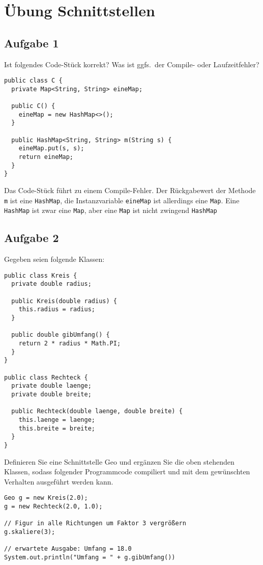 \chapter{Übung Schnittstellen}

\section{Aufgabe 1}
Ist folgendes Code-Stück korrekt? Was ist ggfs.\ der Compile- oder
Laufzeitfehler?

\begin{lstlisting}
public class C {
  private Map<String, String> eineMap;

  public C() {
    eineMap = new HashMap<>();
  }

  public HashMap<String, String> m(String s) {
    eineMap.put(s, s);
    return eineMap;
  }
}
\end{lstlisting}

Das Code-Stück führt zu einem Compile-Fehler. Der Rückgabewert der Methode
\lstinline{m} ist eine \lstinline{HashMap}, die Instanzvariable
\lstinline{eineMap} ist allerdings eine \lstinline{Map}. Eine
\lstinline{HashMap} ist zwar eine \lstinline{Map}, aber eine
\lstinline{Map} ist nicht zwingend \lstinline{HashMap}

\pagebreak

\section{Aufgabe 2}

Gegeben seien folgende Klassen:

\begin{lstlisting}
public class Kreis {
  private double radius;

  public Kreis(double radius) {
    this.radius = radius;
  }

  public double gibUmfang() {
    return 2 * radius * Math.PI;
  }
}

public class Rechteck {
  private double laenge;
  private double breite;

  public Rechteck(double laenge, double breite) {
    this.laenge = laenge;
    this.breite = breite;
  }
}
\end{lstlisting}

Definieren Sie eine Schnittstelle Geo und ergänzen Sie die oben stehenden
Klassen, sodass folgender Programmcode compiliert und mit dem gewünschten
Verhalten ausgeführt werden kann.

\begin{lstlisting}
Geo g = new Kreis(2.0);
g = new Rechteck(2.0, 1.0);

// Figur in alle Richtungen um Faktor 3 vergrößern
g.skaliere(3);

// erwartete Ausgabe: Umfang = 18.0
System.out.println("Umfang = " + g.gibUmfang())
\end{lstlisting}

